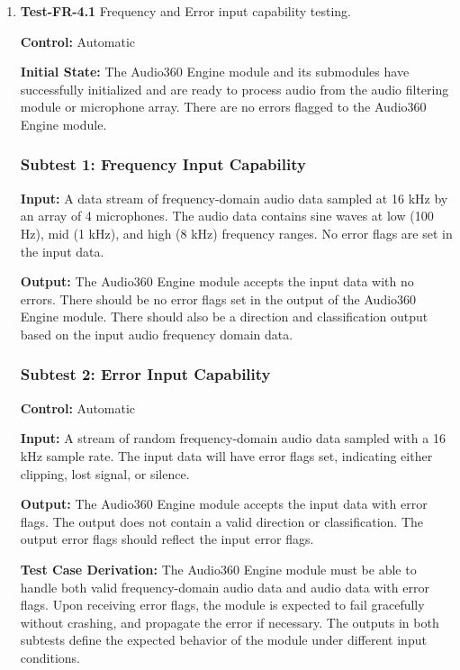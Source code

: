 \documentclass[12pt, titlepage]{article}
\begin{document}
\begin{enumerate}
\item{\textbf{Test-FR-4.1} Frequency and Error input capability testing.\\}

\textbf{Control:} Automatic

\textbf{Initial State:}
The Audio360 Engine module and its submodules have successfully initialized and
are ready to process audio from the audio filtering module or microphone array.
There are no errors flagged to the Audio360 Engine module.

\subsubsection*{Subtest 1: Frequency Input Capability}
\textbf{Input:}
A data stream of frequency-domain audio data sampled at 16 kHz by an array of 
4 microphones. The audio data contains sine waves at low (100 Hz), mid (1 kHz),
and high (8 kHz) frequency ranges. No error flags are set in the input data.

\textbf{Output:}
The Audio360 Engine module accepts the input data with no errors. There should
be no error flags set in the output of the Audio360 Engine module. There should
also be a direction and classification output based on the input audio 
frequency domain data.

\subsubsection*{Subtest 2: Error Input Capability}

\textbf{Control:} Automatic

\textbf{Input:}
A stream of random frequency-domain audio data sampled with a 16 kHz sample
rate. The input data will have error flags set, indicating either 
clipping, lost signal, or silence.

\textbf{Output:}
The Audio360 Engine module accepts the input data with error flags. The output
does not contain a valid direction or classification. The output error flags
should reflect the input error flags.

\textbf{Test Case Derivation:}
The Audio360 Engine module must be able to handle both valid frequency-domain
audio data and audio data with error flags. Upon receiving error flags, the 
module is expected to fail gracefully without crashing, and propagate the error
if necessary. The outputs in both subtests define the expected behavior of the
module under different input conditions.


\end{enumerate}
\end{document}

